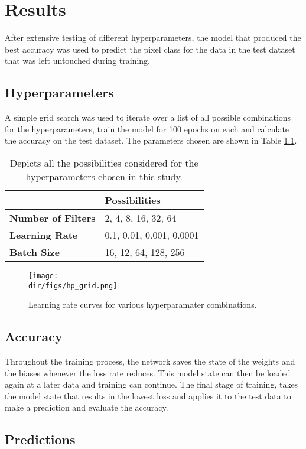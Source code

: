 \chapter{Results}
After extensive testing of different hyperparameters, the model that produced the best accuracy was used to predict the pixel class for the data in the test dataset that was left untouched during training. 
\section{Hyperparameters}
A simple grid search was used to iterate over a list of all possible combinations for the hyperparameters, train the model for 100 epochs on each and calculate the accuracy on the test dataset. The parameters chosen are shown in Table \ref{tab.grid_search}. 
\begin{table}[htbp]
\centering 
\begin{tabular}{l|l}
                           & \textbf{Possibilities}   \\ \hline
\textbf{Number of Filters} & 2, 4, 8, 16, 32, 64      \\ 
\textbf{Learning Rate}     & 0.1, 0.01, 0.001, 0.0001 \\ 
\textbf{Batch Size}        & 16, 12, 64, 128, 256     \\ 
\end{tabular}
\caption[Hyperparameter possibilities]{Depicts all the possibilities considered for the hyperparameters chosen in this study.}
\label{tab.grid_search}
\end{table}
\begin{figure}[htpb]
    \centering
    \texttt{[image: \\dir/figs/hp\_grid.png]}
    \caption[Learning Rate Curves for Various Hyperparamater Combinations]{Learning rate curves for various hyperparamater combinations.}
    \label{fig.hyperparameters}
\end{figure}
\section{Accuracy}
Throughout the training process, the network saves the state of the weights and the biases whenever the loss rate reduces. This model state can then be loaded again at a later data and training can continue. The final stage of training, takes the model state that results in the lowest loss and applies it to the test data to make a prediction and evaluate the accuracy.
\section{Predictions}



